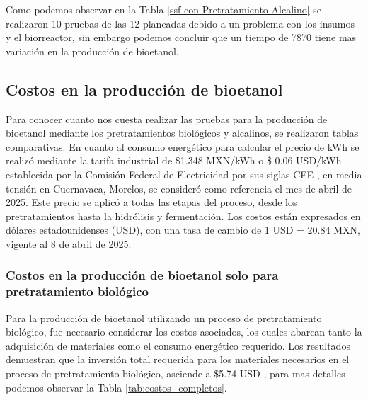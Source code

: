 \documentclass[12pt]{article}
\begin{document}
		
 Como podemos observar en la Tabla \ref{ssf con Pretratamiento Alcalino} se realizaron 10 pruebas de las 12 planeadas debido a un problema con los insumos y el biorreactor, sin embargo podemos concluir que un tiempo de 7870 tiene mas variación en la producción de bioetanol.
				
		
		
		
		
			
			\subsection{Costos en la producción de bioetanol}
	Para conocer cuanto nos cuesta realizar las pruebas para la producción de bioetanol mediante los pretratamientos biológicos y alcalinos, se realizaron tablas comparativas.
	En cuanto al consumo energético para calcular el precio de kWh se realizó mediante la tarifa industrial de \$1.348 MXN/kWh o \$ 0.06 USD/kWh establecida por la Comisión Federal de Electricidad por sus siglas CFE  \cite{CFE2023}, en media tensión en Cuernavaca, Morelos, se consideró como referencia el mes de abril de 2025. Este precio se aplicó a todas las etapas del proceso, desde los pretratamientos hasta la hidrólisis y fermentación. Los costos están expresados en dólares estadounidenses (USD), con una tasa de cambio de 1 USD = 20.84 MXN, vigente al 8 de abril de 2025.
			
		
	 \subsubsection{Costos en la producción de bioetanol solo para pretratamiento biológico}
			
			
Para la producción de bioetanol utilizando un proceso de pretratamiento biológico, fue necesario considerar los costos asociados, los cuales abarcan tanto la adquisición de materiales como el consumo energético requerido. Los resultados demuestran que la inversión total requerida para los materiales necesarios en el proceso de pretratamiento biológico, asciende a \$5.74 USD , para mas detalles podemos observar la Tabla 	\ref{tab:costos_completos}.
\end{document}
